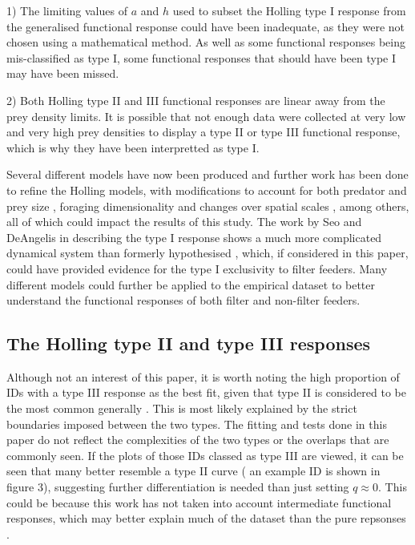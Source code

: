 \documentclass[11pt, a4paper, titlepage]{article}
\begin{document}
1) The limiting values of $a$ and $h$ used to subset the Holling type I response from the generalised functional response could have been inadequate, as they were not chosen using a mathematical method. As well as some functional responses being mis-classified as type I, some functional responses that should have been type I may have been missed.

2) Both Holling type II and III functional responses are linear away from the prey density limits. It is possible that not enough data were collected at very low and very high prey densities to display a type II or type III functional response, which is why they have been interpretted as type I.

Several different models have now been produced and  further work has been done to refine the Holling models, with modifications to account for both predator and prey size \parencite{Aljetlawi2004}, foraging dimensionality \parencite{Pawar2012} and changes over spatial scales \parencite{Rincon2017}, among others, all of which could impact the results of this study. The work by Seo and DeAngelis in describing the type I response shows a much more complicated dynamical system than formerly hypothesised \parencite{Seo2011}, which, if considered in this paper, could have provided evidence for the type I exclusivity to filter feeders. Many different models could further be applied to the empirical dataset to better understand the functional responses of both filter and non-filter feeders.

\subsection{The Holling type II and type III responses}

Although not an interest of this paper, it is worth noting the high proportion of IDs with a type III response as the best fit, given that type II is considered to be the most common generally \parencite{Holling1959b}. This is most likely explained by the strict boundaries imposed between the two types. The fitting and tests done in this paper do not reflect the complexities of the two types or the overlaps that are commonly seen. If the plots of those IDs classed as type III are viewed, it can be seen that many better resemble a type II curve ( an example ID is shown in figure 3), suggesting further differentiation is needed than just setting $q\approx0$. This could be because this work has not taken into account intermediate functional responses, which may better explain much of the dataset than the pure repsonses \parencite{Jeschke2004}.
\end{document}
